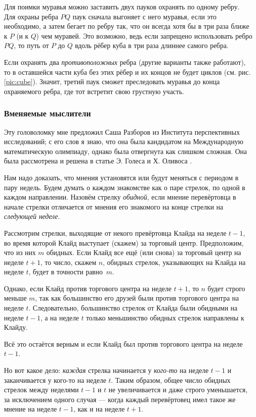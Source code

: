 Для поимки муравья можно заставить двух пауков охранять по одному ребру.
Для охраны ребра $PQ$ паук сначала выгоняет с него муравья, если это необходимо, а затем бегает по ребру так, что он всегда хотя бы в три раза ближе к $P$ (и к $Q$) чем муравей.
Это возможно, ведь если запрещено использовать ребро $PQ$, то путь от $P$ до $Q$ вдоль рёбер куба в три раза длиннее самого ребра.

Если охранять два \emph{противоположных} ребра (другие варианты также работают), то в оставшейся части куба без этих рёбер и их концов не будет циклов (см. рис. \ref{pic:cube}).
Значит, третий паук сможет преследовать муравья до конца охраняемого ребра, где тот встретит свою грустную участь.

\subsubsection*{Вменяемые мыслители}

Эту головоломку мне предложил Саша Разборов из Института перспективных исследований;
с его слов я знаю, что она была кандидатом на Международную математическую олимпиаду, однако была отвергнута как слишком сложная.
Она была рассмотрена и решена в статье Э. Голеса и Х. Оливоса \cite{31}.

Нам надо доказать, что мнения установятся или будут меняться с периодом в пару недель.
Будем думать о каждом знакомстве как о паре стрелок, по одной в каждом направлении.
Назовём стрелку \emph{обидной}, если мнение перевёртовца в начале стрелки отличается от мнения его знакомого на конце стрелки на \emph{следующей неделе}.

Рассмотрим стрелки, выходящие от некого превёртовца Клайда на неделе $t - 1$, во время которой Клайд выступает (скажем) за торговый центр.
Предположим, что из них $m$ обидных.
Если Клайд все ещё (или снова) за торговый центр на неделе $t + 1$, то число, скажем $n$, обидных стрелок, указывающих на Клайда на неделе $t$, будет в точности равно~$m$.

Однако, если Клайд против торгового центра на неделе $t + 1$, то $n$ будет строго меньше $m$, так как большинство его друзей были против торгового центра на неделе $t$.
Следовательно, большинство стрелок от Клайда были обидными на неделе $t - 1$, а на неделе $t$ только меньшинство обидных стрелок направлены к Клайду.

Всё это остаётся верным и если Клайд был против торгового центра на неделе $t - 1$.

Но вот какое дело: \emph{каждая} стрелка начинается у \emph{кого-то} на неделе $t - 1$ и заканчивается у кого-то на неделе $t$.
Таким образом, общее число обидных стрелок между неделями $t - 1$ и $t$ не увеличивается и даже строго уменьшается, за исключением одного случая --- когда каждый перевёртовец имел такое же мнение на неделе $t - 1$, как и на неделе $t + 1$.

